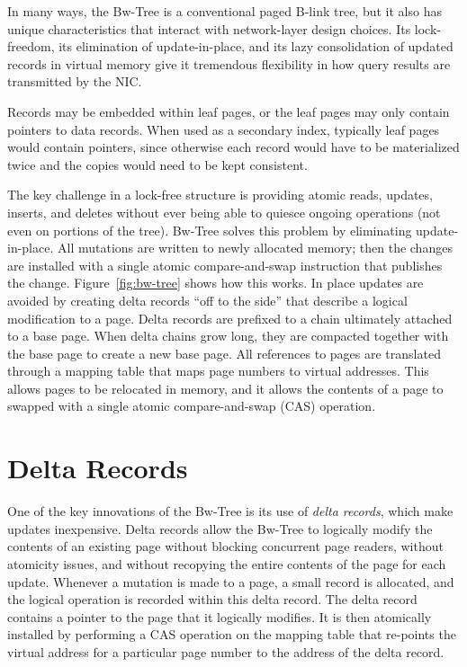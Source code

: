 In many ways, the Bw-Tree is a conventional paged B-link tree,
but it also has unique characteristics that interact with network-layer
design choices. Its lock-freedom, its elimination of update-in-place,
and its lazy consolidation of updated records in virtual memory give it
tremendous flexibility in how query results are transmitted by the NIC.

Records may be embedded within leaf pages, or the leaf pages may
only contain pointers to data records. When used as a secondary index,
typically leaf pages would contain pointers, since otherwise each record would
have to be materialized twice and the copies would need to be kept consistent.

The key challenge in a lock-free structure is providing atomic reads, updates,
inserts, and deletes without ever being able to quiesce ongoing operations (not
even on portions of the tree). Bw-Tree solves this problem by eliminating
update-in-place. All mutations are written to newly allocated memory; then
the changes are installed with a single atomic compare-and-swap instruction
that publishes the change.  Figure~\ref{fig:bw-tree} shows how this works.
In place updates are avoided by creating delta records ``off to the side'' 
that describe a logical modification to a page. Delta records are
prefixed to a chain ultimately attached to a base page.  When delta chains
grow long, they are compacted together with the base page to create a new base page.
All references to pages are translated through a mapping table that maps page
numbers to virtual addresses. This allows pages to be relocated in memory, and
it allows the contents of a page to swapped with a single atomic
compare-and-swap (CAS) operation.
\section{Delta Records}
\label{sec:deltarecords}
One of the key innovations of the Bw-Tree is its use of {\em delta records},
which make updates inexpensive.
Delta records allow the Bw-Tree to logically modify the
contents of an existing page without blocking concurrent page readers, without
atomicity issues, and without recopying the entire contents of the page for
each update.  Whenever a mutation is made to a page, a small record is
allocated, and the logical operation is recorded within this delta record. The delta
record contains a pointer to the page that it logically modifies. It
is then atomically installed by performing a CAS operation on the
mapping table that re-points the virtual address for a particular page number
to the address of the delta record.


